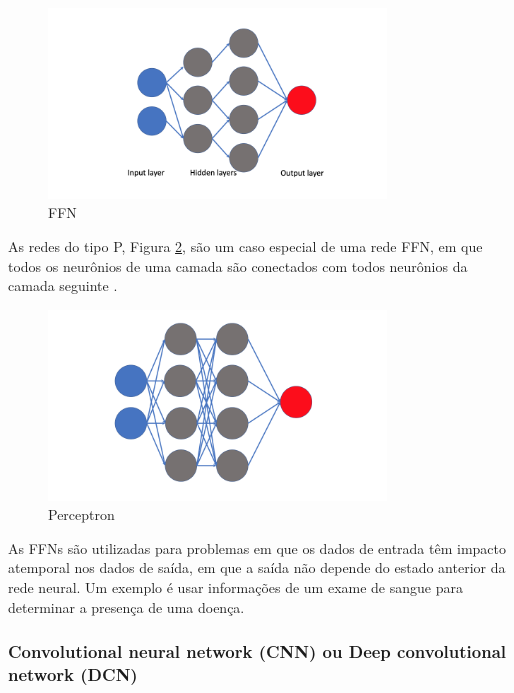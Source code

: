 \begin{figure}[H]
    \centering
    \caption{\label{fig:ffn}FFN}
    \includegraphics[width=0.8\textwidth]{img/revisao_bibliografica/ffn.png}
\end{figure}

As redes do tipo P, Figura \ref{fig:perceptron}, são um caso especial de uma rede FFN, em que todos os neurônios de uma camada são conectados com todos neurônios da camada seguinte \cite{alex2020}.

\begin{figure}[H]
    \centering
    \caption{\label{fig:perceptron}Perceptron}
    \includegraphics[width=0.8\textwidth]{img/revisao_bibliografica/perceptron.png}
\end{figure}

As FFNs são utilizadas para problemas em que os dados de entrada têm impacto atemporal nos dados de saída, em que a saída não depende do estado anterior da rede neural. Um exemplo é usar informações de um exame de sangue para determinar a presença de uma doença.

\subsubsection{Convolutional neural network (CNN) ou Deep convolutional network (DCN)}

